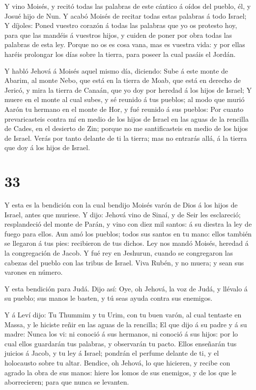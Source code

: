  Y vino Moisés, y recitó todas las palabras de este cántico
á oídos del pueblo, él, y Josué hijo de Nun.  Y acabó
Moisés de recitar todas estas palabras á todo Israel;  Y
díjoles: Poned vuestro corazón á todas las palabras que yo os protesto
hoy, para que las mandéis á vuestros hijos, y cuiden de poner por obra
todas las palabras de esta ley.  Porque no os es cosa vana,
mas es vuestra vida: y por ellas haréis prolongar los días sobre la
tierra, para poseer la cual pasáis el Jordán.

 Y habló Jehová á Moisés aquel mismo día, diciendo:
 Sube á este monte de Abarim, al monte Nebo, que está en la
tierra de Moab, que está en derecho de Jericó, y mira la tierra de
Canaán, que yo doy por heredad á los hijos de Israel;  Y
muere en el monte al cual subes, y sé reunido á tus pueblos; al modo que
murió Aarón tu hermano en el monte de Hor, y fué reunido á sus pueblos:
 Por cuanto prevaricasteis contra mí en medio de los hijos
de Israel en las aguas de la rencilla de Cades, en el desierto de Zin;
porque no me santificasteis en medio de los hijos de Israel.
 Verás por tanto delante de ti la tierra; mas no entrarás
allá, á la tierra que doy á los hijos de Israel.

\hypertarget{section-32}{%
\section{33}\label{section-32}}

 Y esta es la bendición con la cual bendijo Moisés varón de
Dios á los hijos de Israel, antes que muriese.  Y dijo:
Jehová vino de Sinaí, y de Seir les esclareció; resplandeció del monte
de Parán, y vino con diez mil santos: á su diestra la ley de fuego para
ellos.  Aun amó los pueblos; todos sus santos en tu mano:
ellos también se llegaron á tus pies: recibieron de tus dichos.
 Ley nos mandó Moisés, heredad á la congregación de Jacob.
 Y fué rey en Jeshurun, cuando se congregaron las cabezas
del pueblo con las tribus de Israel.  Viva Rubén, y no
muera; y sean sus varones en número.

 Y esta bendición para Judá. Dijo así: Oye, oh Jehová, la
voz de Judá, y llévalo á su pueblo; sus manos le basten, y tú seas ayuda
contra sus enemigos.

 Y á Leví dijo: Tu Thummim y tu Urim, con tu buen varón, al
cual tentaste en Massa, y le hiciste reñir en las aguas de la rencilla;
 El que dijo á su padre y á su madre: Nunca los vi: ni
conoció á sus hermanos, ni conoció á sus hijos: por lo cual ellos
guardarán tus palabras, y observarán tu pacto.  Ellos
enseñarán tus juicios á Jacob, y tu ley á Israel; pondrán el perfume
delante de ti, y el holocausto sobre tu altar.  Bendice, oh
Jehová, lo que hicieren, y recibe con agrado la obra de sus manos: hiere
los lomos de sus enemigos, y de los que le aborrecieren; para que nunca
se levanten.

